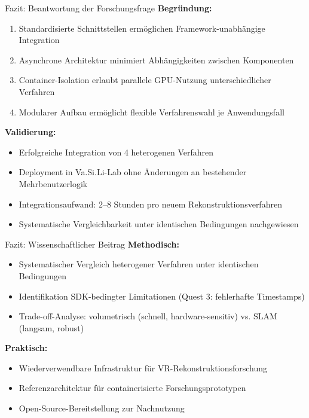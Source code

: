 \begin{frame}{Fazit: Beantwortung der Forschungsfrage}{}
    \textbf{Begründung:}
    \begin{enumerate}
        \item Standardisierte Schnittstellen ermöglichen Framework-unabhängige Integration
        \item Asynchrone Architektur minimiert Abhängigkeiten zwischen Komponenten
        \item Container-Isolation erlaubt parallele GPU-Nutzung unterschiedlicher Verfahren
        \item Modularer Aufbau ermöglicht flexible Verfahrenswahl je Anwendungsfall
    \end{enumerate}
    
    \vfill
    
    \textbf{Validierung:}
    \begin{itemize}
        \item Erfolgreiche Integration von 4 heterogenen Verfahren
        \item Deployment in Va.Si.Li-Lab ohne Änderungen an bestehender Mehrbenutzerlogik
        \item Integrationsaufwand: 2--8 Stunden pro neuem Rekonstruktionsverfahren
        \item Systematische Vergleichbarkeit unter identischen Bedingungen nachgewiesen
    \end{itemize}
\end{frame}

\begin{frame}{Fazit: Wissenschaftlicher Beitrag}{}
    \textbf{Methodisch:}
    \begin{itemize}
        \itemsep0.4em
        \item Systematischer Vergleich heterogener Verfahren unter identischen Bedingungen
        \item Identifikation SDK-bedingter Limitationen (Quest 3: fehlerhafte Timestamps)
        \item Trade-off-Analyse: volumetrisch (schnell, hardware-sensitiv) vs. SLAM (langsam, robust)
    \end{itemize}
    
    \vfill
    
    \textbf{Praktisch:}
    \begin{itemize}
        \itemsep0.4em
        \item Wiederverwendbare Infrastruktur für VR-Rekonstruktionsforschung
        \item Referenzarchitektur für containerisierte Forschungsprototypen
        \item Open-Source-Bereitstellung zur Nachnutzung
    \end{itemize}
\end{frame}

